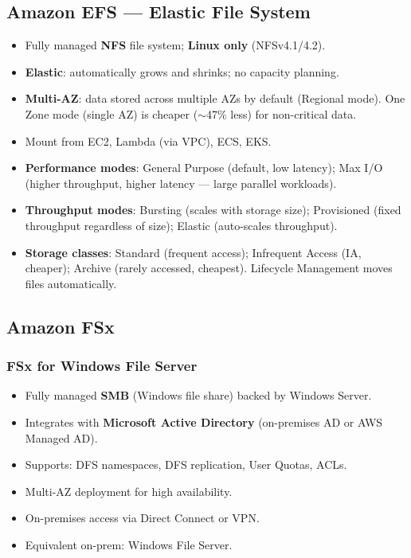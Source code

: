 
\subsection{Amazon EFS --- Elastic File System}

\begin{keyfacts}
\begin{itemize}
  \item Fully managed \textbf{NFS} file system; \textbf{Linux only} (NFSv4.1/4.2).
  \item \textbf{Elastic}: automatically grows and shrinks; no capacity planning.
  \item \textbf{Multi-AZ}: data stored across multiple AZs by default (Regional mode).
        One Zone mode (single AZ) is cheaper ($\sim$47\% less) for non-critical data.
  \item Mount from EC2, Lambda (via VPC), ECS, EKS.
  \item \textbf{Performance modes}: General Purpose (default, low latency); Max I/O (higher throughput,
        higher latency --- large parallel workloads).
  \item \textbf{Throughput modes}: Bursting (scales with storage size); Provisioned (fixed throughput
        regardless of size); Elastic (auto-scales throughput).
  \item \textbf{Storage classes}: Standard (frequent access); Infrequent Access (IA, cheaper);
        Archive (rarely accessed, cheapest). Lifecycle Management moves files automatically.
\end{itemize}
\end{keyfacts}


\subsection{Amazon FSx}

\subsubsection{FSx for Windows File Server}

\begin{itemize}
  \item Fully managed \textbf{SMB} (Windows file share) backed by Windows Server.
  \item Integrates with \textbf{Microsoft Active Directory} (on-premises AD or AWS Managed AD).
  \item Supports: DFS namespaces, DFS replication, User Quotas, ACLs.
  \item Multi-AZ deployment for high availability.
  \item On-premises access via Direct Connect or VPN.
  \item Equivalent on-prem: Windows File Server.
\end{itemize}

